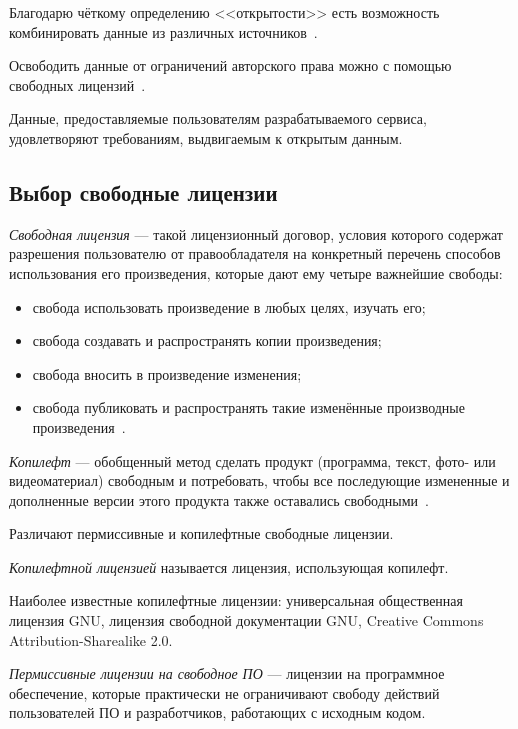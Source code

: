 Благодарю чёткому определению <<открытости>> есть возможность комбинировать данные
из различных источников~\cite{opendatahandbook_open_data}.

Освободить данные от ограничений авторского права можно с помощью свободных
лицензий~\cite{wiki_opendata}.

Данные, предоставляемые пользователям разрабатываемого сервиса, удовлетворяют требованиям, 
выдвигаемым к открытым данным.

\subsection{Выбор свободные лицензии}
\label{ssec:choice_free_licenses}

\textit{Свободная лицензия} --- такой лицензионный договор,
условия которого содержат разрешения пользователю от правообладателя
на конкретный перечень способов использования его произведения,
которые дают ему четыре важнейшие свободы:

\begin{itemize}
\item  
  свобода использовать произведение в любых целях, изучать его;
\item
  свобода создавать и распространять копии произведения;
\item
  свобода вносить в произведение изменения;
\item
  свобода публиковать и распространять такие изменённые производные произведения~\cite{wiki_free_license}.
\end{itemize}

\textit{Копилефт} --- обобщенный метод сделать продукт
(программа, текст, фото- или видеоматериал) свободным и потребовать,
чтобы все последующие измененные и дополненные версии этого продукта также оставались свободными~\cite{gnu_copyleft}.

Различают пермиссивные и копилефтные свободные лицензии.

\textit{Копилефтной лицензией} называется лицензия, использующая копилефт.

Наиболее известные копилефтные лицензии: универсальная общественная лицензия GNU, 
 лицензия свободной документации GNU, Creative Commons Attribution-Sharealike 2.0.

\textit{Пермиссивные лицензии на свободное ПО} --- лицензии на программное обеспечение,
которые практически не ограничивают свободу действий пользователей ПО и разработчиков,
работающих с исходным кодом.

